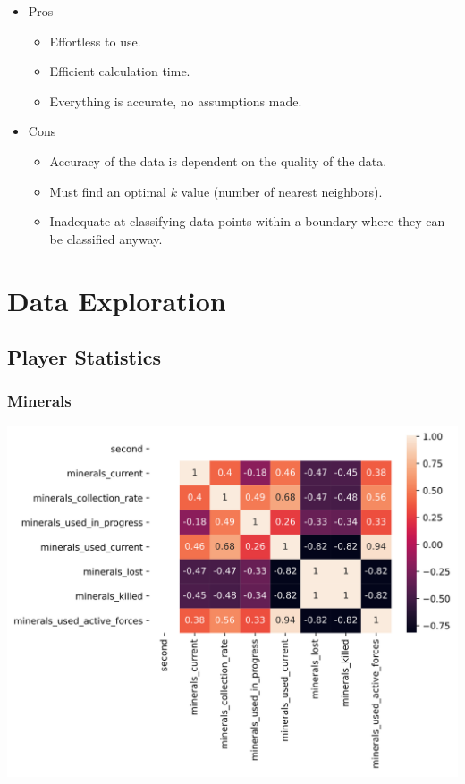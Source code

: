 \documentclass[a4paper,12pt]{report}
\begin{document}
\begin{itemize}[,]
    \setlength\itemsep{-.1cm}
    \item Pros
    \begin{itemize}[,]
        \setlength\itemsep{-.1cm}
        \item Effortless to use.
        \item Efficient calculation time.
        \item Everything is accurate, no assumptions made.
    \end{itemize}
    \item Cons
    \begin{itemize}[,]
        \setlength\itemsep{-.1cm}
        \item Accuracy of the data is dependent on the quality of the data.
        \item Must find an optimal $k$ value (number of nearest neighbors).
        \item Inadequate at classifying data points within a boundary where they can be classified anyway.
    \end{itemize}
\end{itemize}

\section{Data Exploration}

\subsection{Player Statistics}
\subsubsection{Minerals}

\begin{center}
    \captionsetup{type=figure}
    \includegraphics[width=.75\linewidth]{media/minerals_types.png}
\end{center}
\end{document}
